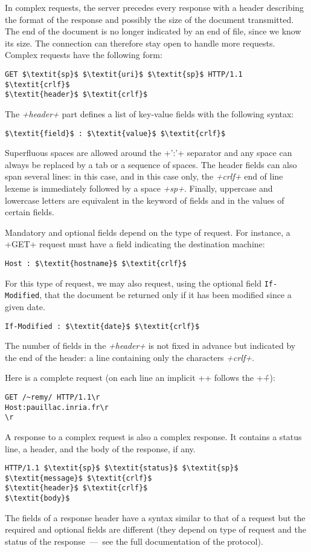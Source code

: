 In complex requests, the server precedes every response with a header
describing the format of the response and possibly the size of the
document transmitted. The end of the document is no longer indicated
by an end of file, since we know its size. The connection can
therefore stay
open to handle more requests. Complex requests have the following form:
%
\begin{lstlisting}
GET $\textit{sp}$ $\textit{uri}$ $\textit{sp}$ HTTP/1.1 $\textit{crlf}$
$\textit{header}$ $\textit{crlf}$
\end{lstlisting}
%
The \textit{\ml+header+} part defines a list of key-value fields with
the following syntax:
%
\begin{lstlisting}
$\textit{field}$ : $\textit{value}$ $\textit{crlf}$
\end{lstlisting}
% 
Superfluous spaces are allowed around the \ml+':'+ separator and any
space can always be replaced by a tab or a sequence of spaces. The
header fields can also span several lines: in this case, and in this
case only, the \textit {\ml+crlf+} end of line lexeme is immediately
followed by a space \textit{\ml+sp+}. Finally, uppercase and lowercase
letters are equivalent in the keyword of fields and in the values of
certain fields.

Mandatory and optional fields depend on the type of request. For
instance, a \ml+GET+ request must have a field indicating the
destination machine:
%
\begin{lstlisting}
Host : $\textit{hostname}$ $\textit{crlf}$
\end{lstlisting}
%
For this type of request, we may also request, using the optional field
\texttt{If-Modified}, that the document be returned only if it has been
modified since a given date.
%
\begin{lstlisting}
If-Modified : $\textit{date}$ $\textit{crlf}$
\end{lstlisting}
%
The number of fields in the \textit{\ml+header+} is not fixed in
advance but indicated by the end of the header: a line
containing only the characters \textit{\ml+crlf+}.

Here is a complete request (on each line an implicit \ml+\n+ follows
the \ml+\r+):
%
\begin{lstlisting}
GET /~remy/ HTTP/1.1\r
Host:pauillac.inria.fr\r
\r
\end{lstlisting}
%
A response to a complex request is also a complex response. It contains
a status line, a header, and the body of the response, if any.
%
\begin{lstlisting}
HTTP/1.1 $\textit{sp}$ $\textit{status}$ $\textit{sp}$ $\textit{message}$ $\textit{crlf}$
$\textit{header}$ $\textit{crlf}$
$\textit{body}$
\end{lstlisting}
%
The fields of a response header have a syntax similar to that of a
request but the required and optional fields are different (they
depend on type of request and the status of the response~---~see the
full documentation of the protocol).

